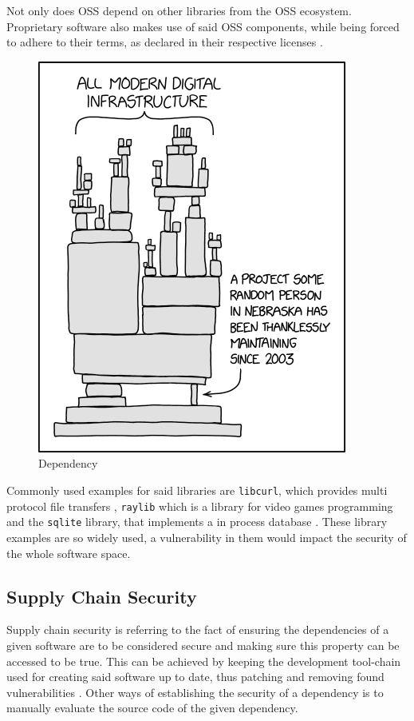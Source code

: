 Not only does OSS depend on other libraries from the OSS ecosystem. Proprietary
software also makes use of said OSS components, while being forced to adhere to
their terms, as declared in their respective licenses \cite{libcurl2024usage}. 


\begin{figure}[H]
    \includegraphics[scale=0.5]{assets/dependency.png}
    \caption{Dependency \cite{xkcdUnknownDependency}}
    \label{img:dependency}
\end{figure}

Commonly used examples for said libraries are \texttt{libcurl}, which provides
multi protocol file transfers \cite{libcurl2024overview}, \texttt{raylib} which
is a library for video games programming \cite{raylib2024landing} and the
\texttt{sqlite} library, that implements a in process database
\cite{sqlite2024landing}. These library examples are so widely used, a
vulnerability in them would impact the security of the whole software space.

\subsection{Supply Chain Security}

Supply chain security is referring to the fact of ensuring the dependencies of
a given software are to be considered secure and making sure this property can
be accessed to be true. This can be achieved by keeping the development
tool-chain used for creating said software up to date, thus patching and
removing found vulnerabilities \cite{ccc2024supplychainsec}. Other ways of
establishing the security of a dependency is to manually evaluate the source
code of the given dependency.

